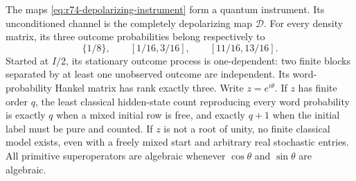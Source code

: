 \begin{theorem}
\label{thm:r74-depolarizing-obstruction}
The maps \eqref{eq:r74-depolarizing-instrument} form a quantum
instrument. Its unconditioned channel is the completely depolarizing map
$\mathcal D$. For every density matrix, its three outcome probabilities
belong respectively to
\[
 \{1/8\},\qquad[1/16,3/16],\qquad[11/16,13/16].
\]
Started at $I/2$, its stationary outcome process is one-dependent: two
finite blocks separated by at least one unobserved outcome are independent.
Its word-probability Hankel matrix has rank exactly three. Write
$z=e^{i\theta}$. If $z$ has finite order $q$, the least classical
hidden-state count reproducing every word probability is exactly $q$ when
a mixed initial row is free, and exactly $q+1$ when the initial label must
be pure and counted. If $z$ is not a root of unity, no finite classical
model exists, even with a freely mixed start and arbitrary real stochastic
entries. All primitive superoperators are algebraic whenever
$\cos\theta$ and $\sin\theta$ are algebraic.
\end{theorem}
